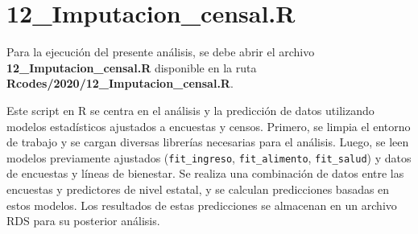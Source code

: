 \documentclass[
  12pt,
]{book}
\newenvironment{Shaded}{\begin{snugshade}}{\end{snugshade}}
\newcommand{\AttributeTok}[1]{\textcolor[rgb]{0.13,0.29,0.53}{#1}}
\newcommand{\DecValTok}[1]{\textcolor[rgb]{0.00,0.00,0.81}{#1}}
\newcommand{\FunctionTok}[1]{\textcolor[rgb]{0.13,0.29,0.53}{\textbf{#1}}}
\newcommand{\NormalTok}[1]{#1}
\newcommand{\OtherTok}[1]{\textcolor[rgb]{0.56,0.35,0.01}{#1}}
\newcommand{\SpecialCharTok}[1]{\textcolor[rgb]{0.81,0.36,0.00}{\textbf{#1}}}
\newcommand{\StringTok}[1]{\textcolor[rgb]{0.31,0.60,0.02}{#1}}
\begin{document}
\begin{Shaded}
\end{Shaded}

\hypertarget{imputacion_censal.r}{%
\chapter*{12\_Imputacion\_censal.R}\label{imputacion_censal.r}}

Para la ejecución del presente análisis, se debe abrir el archivo \textbf{12\_Imputacion\_censal.R} disponible en la ruta \textbf{Rcodes/2020/12\_Imputacion\_censal.R}.

Este script en R se centra en el análisis y la predicción de datos utilizando modelos estadísticos ajustados a encuestas y censos. Primero, se limpia el entorno de trabajo y se cargan diversas librerías necesarias para el análisis. Luego, se leen modelos previamente ajustados (\texttt{fit\_ingreso}, \texttt{fit\_alimento}, \texttt{fit\_salud}) y datos de encuestas y líneas de bienestar. Se realiza una combinación de datos entre las encuestas y predictores de nivel estatal, y se calculan predicciones basadas en estos modelos. Los resultados de estas predicciones se almacenan en un archivo RDS para su posterior análisis.
\end{document}
